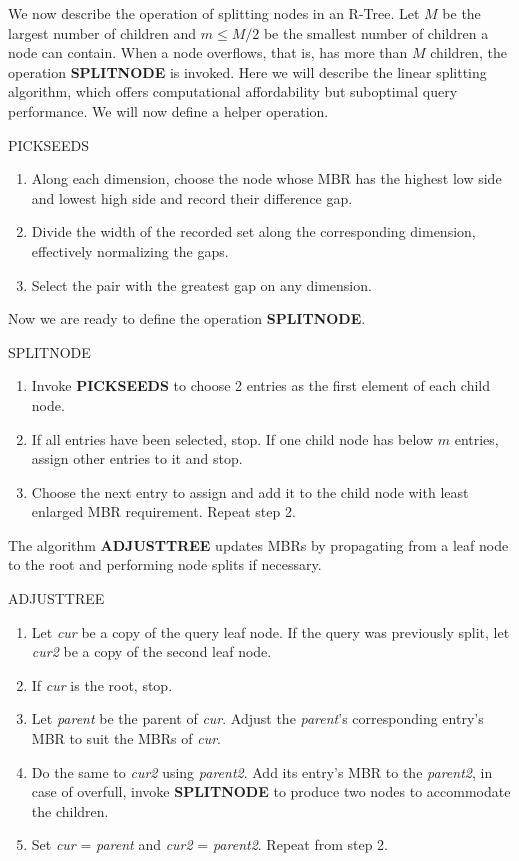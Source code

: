 \documentclass{article}
\begin{document}
We now describe the operation of splitting nodes in an R-Tree. Let $M$ be the largest number of children and $m\le M/2$ be the smallest number of children a node can contain. When a node overflows, that is, has more than $M$ children, the operation \textbf{SPLITNODE} is invoked. Here we will describe the linear splitting algorithm, which offers computational affordability but suboptimal query performance. We will now define a helper operation.
\begin{algorithm}{PICKSEEDS \cite{Guttman1984}}
	\begin{enumerate}
		\item Along each dimension, choose the node whose MBR has the highest low side and lowest high side and record their difference gap.
		\item Divide the width of the recorded set along the corresponding dimension, effectively normalizing the gaps.
		\item Select the pair with the greatest gap on any dimension.
	\end{enumerate}
\end{algorithm}

Now we are ready to define the operation \textbf{SPLITNODE}.

\begin{algorithm}{SPLITNODE \cite{Guttman1984}}
	\begin{enumerate}
		\item Invoke \textbf{PICKSEEDS} to choose 2 entries as the first element of each child node.
		\item If all entries have been selected, stop. If one child node has below $m$ entries, assign other entries to it and stop.
		\item Choose the next entry to assign and add it to the child node with least enlarged MBR requirement. Repeat step 2.
	\end{enumerate}
\end{algorithm}

The algorithm \textbf{ADJUSTTREE} updates MBRs by propagating from a leaf node to the root and performing node splits if necessary.

\begin{algorithm}{ADJUSTTREE \cite{Guttman1984}}
	\begin{enumerate}
		\item Let \textit{cur} be a copy of the query leaf node. If the query was previously split, let \textit{cur2} be a copy of the second leaf node.
		\item If \textit{cur} is the root, stop.
		\item Let \textit{parent} be the parent of \textit{cur}. Adjust the \textit{parent}'s corresponding entry's MBR to suit the MBRs of \textit{cur}.
		\item Do the same to \textit{cur2} using \textit{parent2}. Add its entry's MBR to the \textit{parent2}, in case of overfull, invoke \textbf{SPLITNODE} to produce two nodes to accommodate the children.
		\item Set \textit{cur} = \textit{parent} and \textit{cur2} = \textit{parent2}. Repeat from step 2.
	\end{enumerate}
\end{algorithm}
\end{document}
